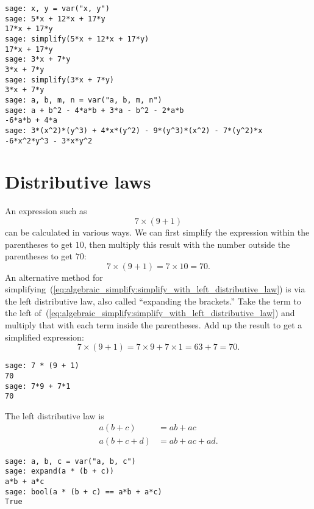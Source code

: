 \begin{lstlisting}
sage: x, y = var("x, y")
sage: 5*x + 12*x + 17*y
17*x + 17*y
sage: simplify(5*x + 12*x + 17*y)
17*x + 17*y
sage: 3*x + 7*y
3*x + 7*y
sage: simplify(3*x + 7*y)
3*x + 7*y
sage: a, b, m, n = var("a, b, m, n")
sage: a + b^2 - 4*a*b + 3*a - b^2 - 2*a*b
-6*a*b + 4*a
sage: 3*(x^2)*(y^3) + 4*x*(y^2) - 9*(y^3)*(x^2) - 7*(y^2)*x
-6*x^2*y^3 - 3*x*y^2
\end{lstlisting}



\section{Distributive laws}

An expression such as
%
\begin{equation}
\label{eq:algebraic_simplify:simplify_with_left_distributive_law}
7 \times (9 + 1)
\end{equation}
%
can be calculated in various ways. We can first simplify the
expression within the parentheses to get $10$, then multiply this
result with the number outside the parentheses to get $70$:
\[
7 \times (9 + 1)
=
7 \times 10
=
70.
\]
An alternative method for
simplifying~(\ref{eq:algebraic_simplify:simplify_with_left_distributive_law})
is via the left distributive law, also
called ``expanding the brackets.'' Take the term to the left
of~(\ref{eq:algebraic_simplify:simplify_with_left_distributive_law})
and multiply that with each term inside the parentheses. Add up the
result to get a simplified expression:
\[
7 \times (9 + 1)
=
7 \times 9 + 7 \times 1
=
63 + 7
=
70.
\]
%
\begin{lstlisting}
sage: 7 * (9 + 1)
70
sage: 7*9 + 7*1
70
\end{lstlisting}
%
The left distributive law is
%
\begin{equation}
\label{eq:algebraic_simplify:left_distributive_law}
\begin{aligned}
a(b + c) &= ab + ac \\
a(b + c + d) &= ab + ac + ad.
\end{aligned}
\end{equation}

\begin{lstlisting}
sage: a, b, c = var("a, b, c")
sage: expand(a * (b + c))
a*b + a*c
sage: bool(a * (b + c) == a*b + a*c)
True
\end{lstlisting}

